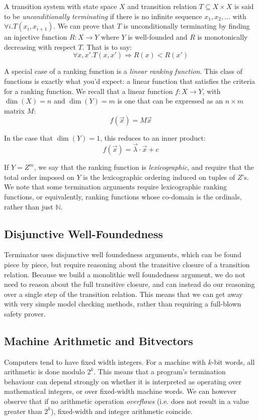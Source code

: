 \documentclass[preprint]{sigplanconf}
\theoremstyle{definition}
\begin{document}
A transition system with state space $X$ and transition relation $T \subseteq X \times X$
is said to be \emph{unconditionally terminating} if there is no infinite sequence
$x_1, x_2, \ldots$ with $\forall i . T(x_i, x_{i+1})$.  We can prove that $T$ is
unconditionally terminating by finding an injective function $R: X \to Y$ where
$Y$ is well-founded and $R$ is monotonically decreasing with respect $T$.  That is
to say:
$$\forall x, x' . T(x, x') \Rightarrow R(x) < R(x')$$

A special case of a ranking function is a \emph{linear ranking function}.  This
class of functions is exactly what you'd expect: a linear function that satisfies
the criteria for a ranking function.  We recall that a linear function $f: X \to Y$,
with $\dim(X) = n$ and $\dim(Y) = m$
is one that can be expressed as an $n \times m$ matrix $M$:
$$f(\vec{x}) = M\vec{x}$$

In the case that $\dim(Y) = 1$, this reduces to an inner product:
$$f(\vec{x}) = \vec{\lambda} \cdotp \vec{x} + c$$

If $Y = Z^m$, we say that the ranking function is \emph{lexicographic},
and require that the total order imposed on $Y$ is the lexicographic ordering
induced on tuples of $Z$'s.  We note that some termination arguments
require lexicographic ranking functions, or equivalently, ranking functions
whose co-domain is the ordinals, rather than just $\mathbb{N}$.

\subsection{Disjunctive Well-Foundedness}
Terminator uses disjunctive well foundedness arguments, which can be found
piece by piece, but require reasoning about the transitive closure of a transition
relation.  Because we build a monolithic well foundedness argument, we
do not need to reason about the full transitive closure, and can instead do our
reasoning over a single step of the transition relation.  This means that we
can get away with very simple model checking methods, rather than requiring
a full-blown safety prover.

\subsection{Machine Arithmetic and Bitvectors} \label{sec:machine.arith} 
Computers tend to have fixed width integers.  For a machine with $k$-bit words,
all arithmetic is done modulo $2^k$.  This means that a program's termination
behaviour can depend strongly on whether it is interpreted as operating over
mathematical integers, or over fixed-width machine words.  We can however
observe that if no arithmetic operation \emph{overflows} (i.e. does not result
in a value greater than $2^k$), fixed-width and integer arithmetic coincide.
\end{document}
